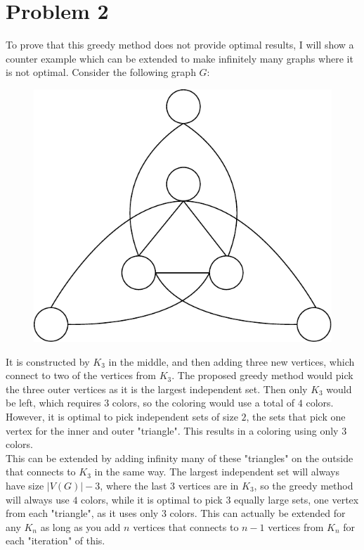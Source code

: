 \documentclass[a4paper]{article}
\begin{document}
\section{Problem 2}
To prove that this greedy method does not provide optimal results, I will show a counter example which can be extended to make infinitely many graphs where it is not optimal. Consider the following graph $G$:
\begin{figure}[H]
  \centering
  \includegraphics[scale=0.75]{fig1.pdf}
\end{figure}
It is constructed by $K_3$ in the middle, and then adding three new vertices, which connect to two of the vertices from $K_3$. The proposed greedy method would pick the three outer vertices as it is the largest independent set. Then only $K_3$ would be left, which requires $3$ colors, so the coloring would use a total of $4$ colors. However, it is optimal to pick independent sets of size $2$, the sets that pick one vertex for the inner and outer "triangle". This results in a coloring using only $3$ colors. \\
This can be extended by adding infinity many of these "triangles" on the outside that connects to $K_3$ in the same way. The largest independent set will always have size $|V(G)|-3$, where the last $3$ vertices are in $K_3$, so the greedy method will always use $4$ colors, while it is optimal to pick $3$ equally large sets, one vertex from each "triangle", as it uses only $3$ colors. This can actually be extended for any $K_n$ as long as you add $n$ vertices that connects to $n-1$ vertices from $K_n$ for each "iteration" of this.
\end{document}
